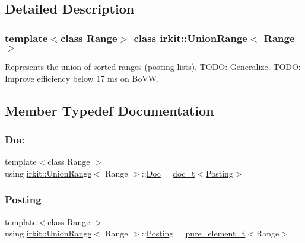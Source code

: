 \subsection{Detailed Description}
\subsubsection*{template$<$class Range$>$\newline
class irkit\+::\+Union\+Range$<$ Range $>$}

Represents the union of sorted ranges (posting lists). T\+O\+DO\+: Generalize. T\+O\+DO\+: Improve efficiency below 17 ms on Bo\+VW. 

\subsection{Member Typedef Documentation}
\mbox{\label{classirkit_1_1UnionRange_a387589b1f09868b60485c4ab8c61f97a}} 
\subsubsection{\texorpdfstring{Doc}{Doc}}
{\footnotesize\ttfamily template$<$class Range $>$ \\
using \hyperlink{classirkit_1_1UnionRange}{irkit\+::\+Union\+Range}$<$ Range $>$\+::\hyperlink{classirkit_1_1UnionRange_a387589b1f09868b60485c4ab8c61f97a}{Doc} =  \hyperlink{namespaceirkit_a595d83053e112c98ab2a1b65e5dd74be}{doc\+\_\+t}$<$\hyperlink{classirkit_1_1UnionRange_a5f694970419f5a60d7fd41d740556229}{Posting}$>$\hspace{0.3cm}{\ttfamily [protected]}}

\mbox{\label{classirkit_1_1UnionRange_a5f694970419f5a60d7fd41d740556229}} 
\subsubsection{\texorpdfstring{Posting}{Posting}}
{\footnotesize\ttfamily template$<$class Range $>$ \\
using \hyperlink{classirkit_1_1UnionRange}{irkit\+::\+Union\+Range}$<$ Range $>$\+::\hyperlink{classirkit_1_1UnionRange_a5f694970419f5a60d7fd41d740556229}{Posting} =  \hyperlink{namespaceirkit_afcffab67300c5c703cb38a363c9a6f1d}{pure\+\_\+element\+\_\+t}$<$Range$>$\hspace{0.3cm}{\ttfamily [protected]}}

